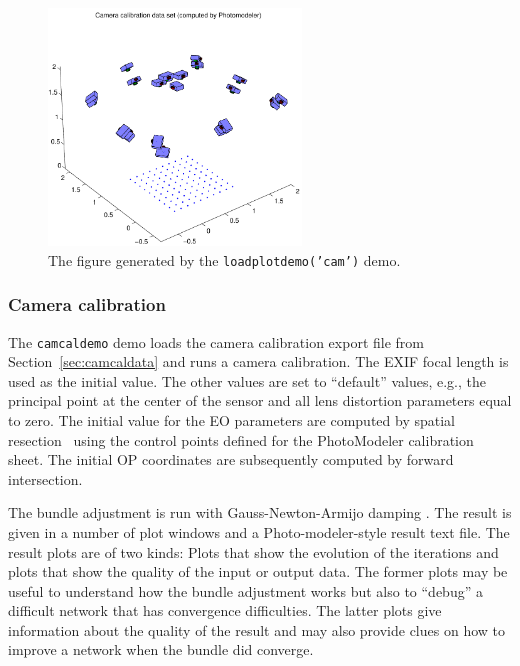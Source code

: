 \documentclass{article}
\begin{document}
\begin{figure}[tbp]
\centering
\includegraphics[width=0.6\textwidth]{./ill/ccam.pdf}
\caption{\label{fig:camcalib}
The figure generated by the \texttt{loadplotdemo('cam')} demo.}
\end{figure}

\subsubsection{Camera calibration}
\label{sec:orga3503b5}

The \texttt{camcaldemo} demo loads the camera calibration export file from
Section~\ref{sec:camcaldata} and runs a camera calibration. The
EXIF focal length is used as the initial value. The other values are
set to ``default'' values, e.g., the principal point at the center of
the sensor and all lens distortion parameters equal to zero. The
initial value for the EO parameters are computed by spatial
resection~\citep[Chap.~11.1.3.4]{Haralick1994:Review,McGlone2004:Manual}
using the control points defined for the PhotoModeler calibration
sheet. The initial OP coordinates are subsequently computed by forward
intersection.

The bundle adjustment is run with Gauss-Newton-Armijo damping
\citep{Borlin2013:Bundle}. The result is given in a number of plot
windows and a Photo-modeler-style result text file. The result plots
are of two kinds: Plots that show the evolution of the iterations and
plots that show the quality of the input or output data. The former
plots may be useful to understand how the bundle adjustment works but
also to ``debug'' a difficult network that has convergence
difficulties. The latter plots give information about the quality of
the result and may also provide clues on how to improve a network when
the bundle did converge.
\end{document}
